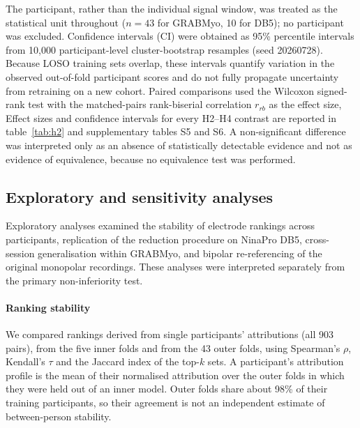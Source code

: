 The participant, rather than the individual signal window, was treated as the statistical unit throughout ($n = 43$ for GRABMyo, 10 for DB5); no participant was excluded. Confidence intervals (CI) were obtained as 95\% percentile intervals from 10,000 participant-level cluster-bootstrap resamples (seed 20260728). Because LOSO training sets overlap, these intervals quantify variation in the observed out-of-fold participant scores and do not fully propagate uncertainty from retraining on a new cohort. Paired comparisons used the Wilcoxon signed-rank test with the matched-pairs rank-biserial correlation $r_{rb}$ as the effect size,  Effect sizes and confidence intervals for every H2--H4 contrast are reported in table~\ref{tab:h2} and supplementary tables S5 and S6. A non-significant difference was interpreted only as an absence of statistically detectable evidence and not as evidence of equivalence, because no equivalence test was performed.

\subsection[Exploratory and sensitivity analyses]{Exploratory and sensitivity analyses}
\label{sec:exploratory}

Exploratory analyses examined the stability of electrode rankings across participants, replication of the reduction procedure on NinaPro DB5, cross-session generalisation within GRABMyo, and bipolar re-referencing of the original monopolar recordings. These analyses were interpreted separately from the primary non-inferiority test. 

\paragraph{Ranking stability} We compared rankings derived from single participants' attributions (all 903 pairs), from the five inner folds and from the 43 outer folds, using Spearman's $\rho$, Kendall's $\tau$ and the Jaccard index of the top-$k$ sets. A participant's attribution profile is the mean of their normalised attribution over the outer folds in which they were held out of an inner model. Outer folds share about 98\% of their training participants, so their agreement is not an independent estimate of between-person stability.

